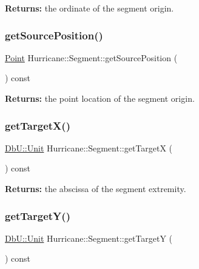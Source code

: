 {\bfseries Returns\+:} the ordinate of the segment origin. \mbox{\label{classHurricane_1_1Segment_a41c4b88c35b9af0ad741205d0a8ea9c2}} 
\subsubsection{\texorpdfstring{get\+Source\+Position()}{getSourcePosition()}}
{\footnotesize\ttfamily \mbox{\hyperlink{classHurricane_1_1Point}{Point}} Hurricane\+::\+Segment\+::get\+Source\+Position (\begin{DoxyParamCaption}{ }\end{DoxyParamCaption}) const\hspace{0.3cm}{\ttfamily [virtual]}}

{\bfseries Returns\+:} the point location of the segment origin. \mbox{\label{classHurricane_1_1Segment_abba6713e109a0925c078a9785274f389}} 
\subsubsection{\texorpdfstring{get\+Target\+X()}{getTargetX()}}
{\footnotesize\ttfamily \mbox{\hyperlink{group__DbUGroup_ga4fbfa3e8c89347af76c9628ea06c4146}{Db\+U\+::\+Unit}} Hurricane\+::\+Segment\+::get\+TargetX (\begin{DoxyParamCaption}{ }\end{DoxyParamCaption}) const\hspace{0.3cm}{\ttfamily [pure virtual]}}

{\bfseries Returns\+:} the abscissa of the segment extremity. \mbox{\label{classHurricane_1_1Segment_a27d530abcff9742b81c4b549db161b90}} 
\subsubsection{\texorpdfstring{get\+Target\+Y()}{getTargetY()}}
{\footnotesize\ttfamily \mbox{\hyperlink{group__DbUGroup_ga4fbfa3e8c89347af76c9628ea06c4146}{Db\+U\+::\+Unit}} Hurricane\+::\+Segment\+::get\+TargetY (\begin{DoxyParamCaption}{ }\end{DoxyParamCaption}) const\hspace{0.3cm}{\ttfamily [pure virtual]}}

